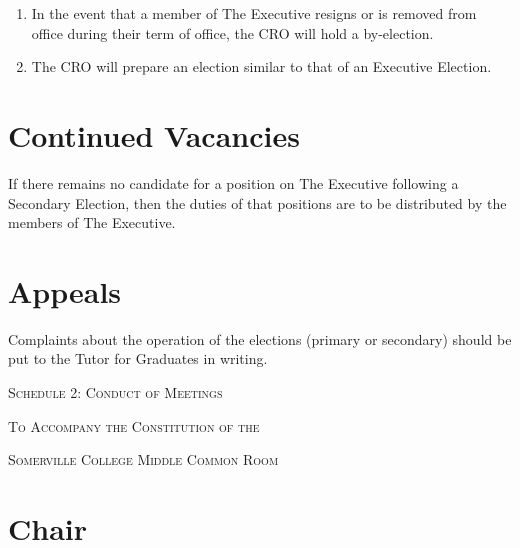 \documentclass[11pt, a4paper]{article}
\begin{document}
\begin{enumerate}
	\item In the event that a member of The Executive resigns or is removed from office during their term of office, the CRO will hold a by-election.
    \item The CRO will prepare an election similar to that of an Executive Election.
\end{enumerate}





\section{Continued Vacancies}
\label{sec:continued_vacancies}

If there remains no candidate for a position on The Executive following a Secondary Election, then the duties of that positions are to be distributed by the members of The Executive.





\section{Appeals}
\label{sec:appeals}

Complaints about the operation of the elections (primary or secondary) should be put to the Tutor for Graduates in writing.





\clearpage
\setcounter{section}{0}





\centerline{{\Huge \textsc{Schedule 2: Conduct of Meetings}}}
\vspace{2mm}
\centerline{{\Large \textsc{To Accompany the Constitution of the}}}
\vspace{2mm}
\centerline{{\Large \textsc{Somerville College Middle Common Room}}}





\section{Chair}
\label{sec:chair}
\end{document}
